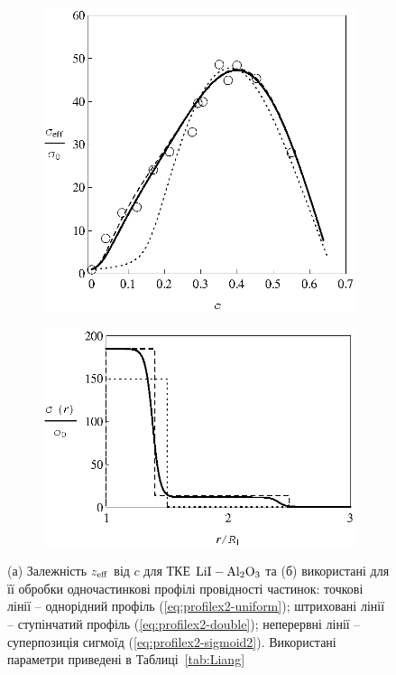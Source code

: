 \documentclass[14pt,twoside]{vakthesis}
\begin{document}
\begin{figure}[!ht]
	\centering
	\begin{subfigure}[b]{0.48\textwidth}
		\includegraphics[width=\textwidth]{Fig12_Liang_LiI-Al2O3-Processing.eps}
		\caption{} \label{fig:Liang_LiI-Al2O3-Processing-a}
	\end{subfigure}
	\quad
	\begin{subfigure}[b]{0.48\textwidth}
		\includegraphics[width=\textwidth]{Fig13_Liang_LiI-Al2O3-Profile.eps}
		\caption{} \label{fig:Liang_LiI-Al2O3-Processing-b}
	\end{subfigure}
	\caption{\label{fig:Liang_LiI-Al2O3-Processing} 
		(а) Залежність ${z}_{\rm eff}$ від $c$ для ТКЕ $\rm{LiI-Al_2O_3}$ \cite{Liang1973} та (б) використані для її обробки одночастинкові профілі провідності частинок: точкові лінії -- однорідний профіль (\ref{eq:profilex2-uniform}); штриховані лінії -- ступінчатий профіль (\ref{eq:profilex2-double}); неперервні лінії -- суперпозиція сигмоїд (\ref{eq:profilex2-sigmoid2}). Використані параметри приведені в Таблиці~\ref{tab:Liang}}
\end{figure}
\end{document}
